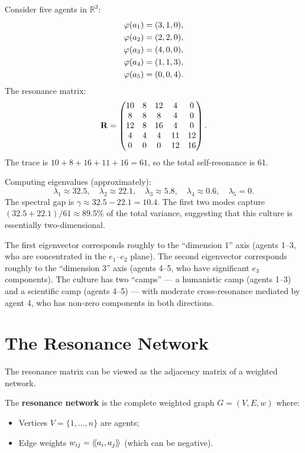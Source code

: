 \begin{example}
\label{ex:spectral}
Consider five agents in $\mathbb{R}^3$:
\begin{align*}
  \varphi(a_1) &= (3, 1, 0), \\
  \varphi(a_2) &= (2, 2, 0), \\
  \varphi(a_3) &= (4, 0, 0), \\
  \varphi(a_4) &= (1, 1, 3), \\
  \varphi(a_5) &= (0, 0, 4).
\end{align*}
The resonance matrix:
\[
  \mathbf{R} = \begin{pmatrix}
  10 & 8 & 12 & 4 & 0 \\
  8 & 8 & 8 & 4 & 0 \\
  12 & 8 & 16 & 4 & 0 \\
  4 & 4 & 4 & 11 & 12 \\
  0 & 0 & 0 & 12 & 16
  \end{pmatrix}.
\]
The trace is $10 + 8 + 16 + 11 + 16 = 61$, so the total self-resonance is 61.

Computing eigenvalues (approximately):
\[
  \lambda_1 \approx 32.5, \quad \lambda_2 \approx 22.1, \quad
  \lambda_3 \approx 5.8, \quad \lambda_4 \approx 0.6, \quad \lambda_5 = 0.
\]
The spectral gap is $\gamma \approx 32.5 - 22.1 = 10.4$. The first two modes
capture $(32.5 + 22.1)/61 \approx 89.5\%$ of the total variance, suggesting
that this culture is essentially two-dimensional.

The first eigenvector corresponds roughly to the ``dimension 1'' axis
(agents 1--3, who are concentrated in the $e_1$--$e_2$ plane). The second
eigenvector corresponds roughly to the ``dimension 3'' axis (agents 4--5, who
have significant $e_3$ components). The culture has two ``camps'' --- a
humanistic camp (agents 1--3) and a scientific camp (agents 4--5) --- with
moderate cross-resonance mediated by agent 4, who has non-zero components in
both directions.
\end{example}


\section{The Resonance Network}

The resonance matrix can be viewed as the adjacency matrix of a weighted network.

\begin{definition}
\label{def:resonance-network}
The \textbf{resonance network} is the complete weighted graph $G = (V, E, w)$
where:
\begin{itemize}
\item Vertices $V = \{1, \ldots, n\}$ are agents;
\item Edge weights $w_{ij} = \langle\!\langle a_i, a_j \rangle\!\rangle$ (which can be negative).
\end{itemize}
\end{definition}

